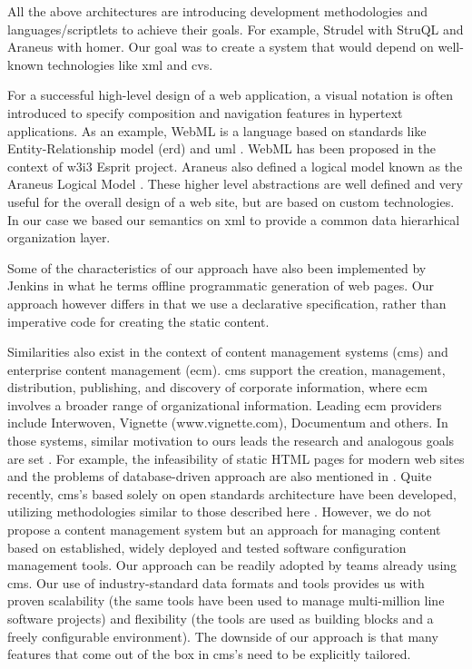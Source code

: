 \documentclass{elsart}
\begin{document}
All the above architectures are introducing development methodologies and languages/scriptlets to achieve their goals. For example, Strudel with StruQL
and Araneus with homer. Our goal was to create a system
that would depend on well-known technologies like {\sc xml} and {\sc cvs}.

For a successful high-level design of a web application,
a visual notation is often introduced to specify composition and navigation features in
hypertext applications.
As an example, {\sc WebML} \cite{CFB00,WEBML} is a language based on standards like Entity-Relationship model {\sc (erd)} and {\sc uml} \cite{UML}.
{\sc WebML} has been proposed in the context of {\sc w3i3} Esprit project.
Araneus also defined a logical model known as the Araneus Logical Model \cite{MAM03}.
These higher level abstractions are well defined and very useful for the overall design of a web site, but are based on custom technologies.
In our case we based our semantics on {\sc xml} to provide a common data hierarhical organization layer.

Some of the characteristics of our approach have also been implemented by
Jenkins \cite{Jen04} in what he terms
offline programmatic generation of web pages.
Our approach however differs in that we use a declarative specification,
rather than imperative code for creating the static content.

Similarities also exist in the context of content management systems ({\sc cms}) and enterprise content management ({\sc ecm}).
{\sc cms} support the creation, management, distribution, publishing, and discovery of corporate information, where {\sc ecm} 
involves a broader range of organizational information. Leading {\sc ecm} providers include Interwoven, 
Vignette (www.vignette.com), Documentum and others. In those systems, similar motivation to ours 
leads the research and analogous goals are set \cite{KW05,DOC05}. For example, the infeasibility of static HTML pages for modern 
web sites and the problems of database-driven approach are also mentioned in \cite{KW05}. Quite recently, {\sc cms}'s based solely on 
open standards architecture have been developed, utilizing methodologies similar to those described here \cite{OS05}. However,
 we do not propose a content management system but an approach for managing content based on established, widely deployed 
and tested software configuration management tools. Our approach can be readily adopted by teams already using {\sc cms}. 
Our use of industry-standard data formats and tools provides us with proven scalability (the same tools have been used 
to manage multi-million line software projects) and flexibility (the tools are used as building blocks and a freely 
configurable environment). The downside of our approach is that many features that come out of the box in {\sc cms}'s need 
to be explicitly tailored.
\end{document}
